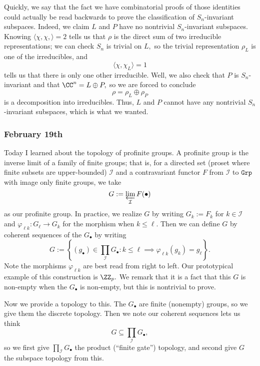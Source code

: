 Quickly, we say that the fact we have combinatorial proofs of those identities could actually be read backwards to prove the classification of $S_n$-invariant subspaces. Indeed, we claim $L$ and $P$ have no nontrivial $S_n$-invariant subspaces. Knowing $\langle\chi,\chi,\rangle=2$ tells us that $\rho$ is the direct sum of two irreducible representations; we can check $S_n$ is trivial on $L,$ so the trivial representation $\rho_L$ is one of the irreducibles, and
\[\langle\chi,\chi_L\rangle=1\]
tells us that there is only one other irreducible. Well, we also check that $P$ is $S_n$-invariant and that $\CC^n=L\oplus P,$ so we are forced to conclude
\[\rho=\rho_L\oplus\rho_P\]
is a decomposition into irreducibles. Thus, $L$ and $P$ cannot have any nontrivial $S_n$-invariant subspaces, which is what we wanted.

\subsubsection{February 19th}
Today I learned about the topology of profinite groups. A profinite group is the inverse limit of a family of finite groups; that is, for a directed set (proset where finite subsets are upper-bounded) $\mathcal I$ and a contravariant functor $F$ from $\mathcal I$ to $\texttt{Grp}$ with image only finite groups, we take
\[G:=\varprojlim_{\mathcal I}F(\bullet)\]
as our profinite group. In practice, we realize $G$ by writing $G_k:=F_k$ for $k\in\mathcal I$ and $\varphi_{\ell k}:G_\ell\to G_k$ for the morphism when $k\le\ell.$ Then we can define $G$ by coherent sequences of the $G_\bullet$ by writing
\[G:=\left\{(g_\bullet)\in\prod_\mathcal IG_\bullet:k\le\ell\implies\varphi_{\ell k}(g_k)=g_\ell\right\}.\]
Note the morphisms $\varphi_{\ell k}$ are best read from right to left. Our prototypical example of this construction is $\ZZ_p.$ We remark that it is a fact that this $G$ is non-empty when the $G_\bullet$ is non-empty, but this is nontrivial to prove.

Now we provide a topology to this. The $G_\bullet$ are finite (nonempty) groups, so we give them the discrete topology. Then we note our coherent sequences lets us think
\[G\subseteq\prod_\mathcal IG_\bullet,\]
so we first give $\prod_\mathcal IG_\bullet$ the product (``finite gate'') topology, and second give $G$ the subspace topology from this.

